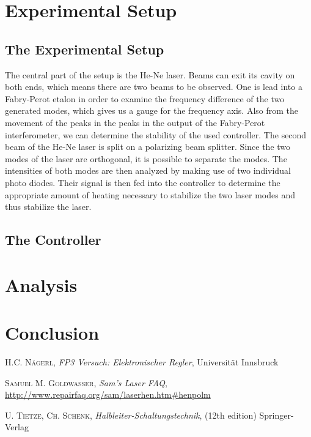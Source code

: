\documentclass[a4paper,10pt]{article}
\begin{document}
\section{Experimental Setup}
\subsection{The Experimental Setup}
The central part of the setup is the He-Ne laser. Beams can exit its cavity on both ends, which means there are two beams to be observed. One is lead into a Fabry-Perot etalon in order to examine the frequency difference of the two generated modes, which gives us a gauge for the frequency axis. Also from the movement of the peaks in the peaks in the output of the Fabry-Perot interferometer, we can determine the stability of the used controller.
\newline
The second beam of the He-Ne laser is split on a polarizing beam splitter. Since the two modes of the laser are orthogonal, it is possible to separate the modes. The intensities of both modes are then analyzed by making use of two individual photo diodes. Their signal is then fed into the controller to determine the appropriate amount of heating necessary to stabilize the two laser modes and thus stabilize the laser.
\subsection{The Controller}


\section{Analysis}

\section{Conclusion}

\begin{thebibliography}{99}
\textsc{H.C. Nägerl}, \textit{FP3 Versuch: Elektronischer Regler}, Universität Innsbruck

\textsc{Samuel M. Goldwasser}, \textit{Sam's Laser FAQ}, \url{http://www.repairfaq.org/sam/laserhen.htm#henpolm}

\textsc{U. Tietze, Ch. Schenk}, \textit{Halbleiter-Schaltungstechnik}, (12th edition) Springer-Verlag
\end{thebibliography}
\end{document}
